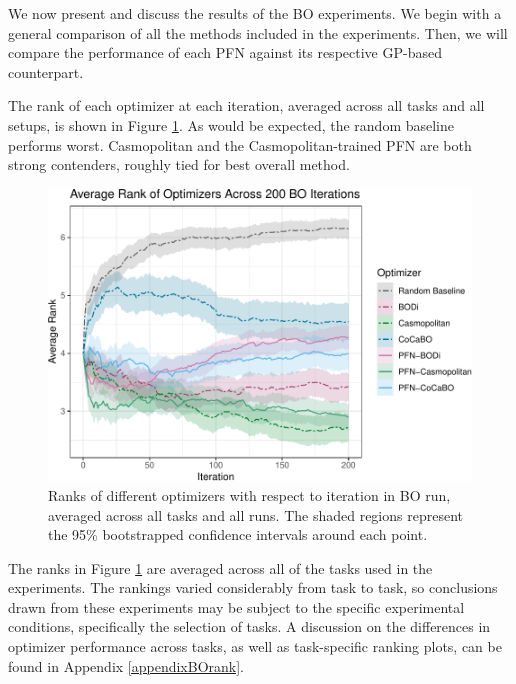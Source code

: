 \documentclass[12pt,twoside]{reedthesis}
\begin{document}
We now present and discuss the results of the BO experiments. We begin with a general comparison of all the methods included in the experiments. Then, we will compare the performance of each PFN against its respective GP-based counterpart.

The rank of each optimizer at each iteration, averaged across all tasks and all setups, is shown in Figure \ref{fig:bo-rank}. As would be expected, the random baseline performs worst. Casmopolitan and the Casmopolitan-trained PFN are both strong contenders, roughly tied for best overall method.
\begin{figure}
\centering
\includegraphics{thesis_files/figure-latex/bo-rank-1.pdf}
\caption{\label{fig:bo-rank}Ranks of different optimizers with respect to iteration in BO run, averaged across all tasks and all runs. The shaded regions represent the 95\% bootstrapped confidence intervals around each point.}
\end{figure}
The ranks in Figure \ref{fig:bo-rank} are averaged across all of the tasks used in the experiments. The rankings varied considerably from task to task, so conclusions drawn from these experiments may be subject to the specific experimental conditions, specifically the selection of tasks. A discussion on the differences in optimizer performance across tasks, as well as task-specific ranking plots, can be found in Appendix \ref{appendixBOrank}.
\end{document}
